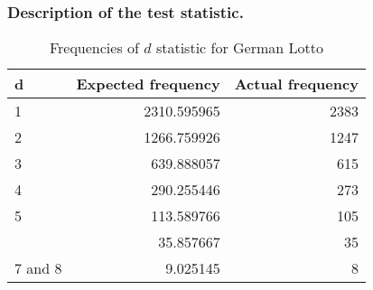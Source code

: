 \subsubsection{Description of the test statistic.}


\begin{table}

    \caption{Frequencies of $d$ statistic for German Lotto}
    \centering
    \begin{tabular}[t]{lrr}
    \toprule
    d & Expected frequency & Actual frequency\\
    \midrule
    1 & 2310.595965 & 2383\\
    2 & 1266.759926 & 1247\\
    3 & 639.888057 & 615\\
    4 & 290.255446 & 273\\
    5 & 113.589766 & 105\\
    \addlinespace
    6 & 35.857667 & 35\\
    7 and 8 & 9.025145 & 8\\
    \bottomrule
    \end{tabular}
    \end{table}






